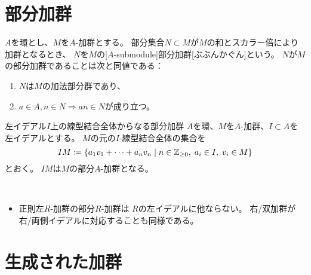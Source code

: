 \documentclass[report]{jlreq}
\begin{document}
%
\section{部分加群}

\begin{definition}[部分加群]
    $A$を環とし、$M$を$A$-加群とする。
    部分集合$N \subset M$が$M$の和とスカラー倍により加群となるとき、
    $N$を$M$の[$A$-submodule]{部分加群}[ぶぶんかぐん]という。
    $N$が$M$の部分加群であることは次と同値である：
    \begin{enumerate}
        \item $N$は$M$の加法部分群であり、
        \item $a \in A, n \in N \Rightarrow an \in N$が成り立つ。
    \end{enumerate}
\end{definition}

\begin{definition}[イデアル上の線型結合からなる部分加群]
        {左イデアル$I$上の線型結合全体からなる部分加群}
    $A$を環、$M$を$A$-加群、$I \subset A$を左イデアルとする。
    $M$の元の$I$-線型結合全体の集合を
    \begin{equation}
        IM \coloneqq \{
            a_1 v_1 + \cdots + a_n v_n \mid
            n \in \mathbb{Z}_{\ge 0}, \; a_i \in I, \; v_i \in M
        \}
    \end{equation}
    とおく。
    $IM$は$M$の部分$A$-加群となる。
\end{definition}

\begin{example}[部分加群の例]
    ~
    \begin{itemize}
        \item 正則左$R$-加群の部分$R$-加群は
            $R$の左イデアルに他ならない。
            右/双加群が右/両側イデアルに対応することも同様である。
    \end{itemize}
\end{example}

%
\section{生成された加群}
\end{document}
